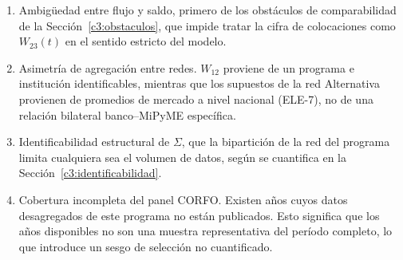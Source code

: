 \begin{enumerate}
    \item Ambigüedad entre flujo y saldo, primero de los obstáculos de comparabilidad de la Sección~\ref{c3:obstaculos}, que impide tratar la cifra de colocaciones como $W_{23}(t)$ en el sentido estricto del modelo.
    \item Asimetría de agregación entre redes. $W_{12}$ proviene de un programa e institución identificables, mientras que los supuestos de la red Alternativa provienen de promedios de mercado a nivel nacional (ELE-7), no de una relación bilateral banco--MiPyME específica.
    \item Identificabilidad estructural de $\Sigma$, que la bipartición de la red del programa limita cualquiera sea el volumen de datos, según se cuantifica en la Sección~\ref{c3:identificabilidad}.
    \item Cobertura incompleta del panel CORFO. Existen años cuyos datos desagregados de este programa no están publicados. Esto significa que los años disponibles no son una muestra representativa del período completo, lo que introduce un sesgo de selección no cuantificado.
\end{enumerate}
